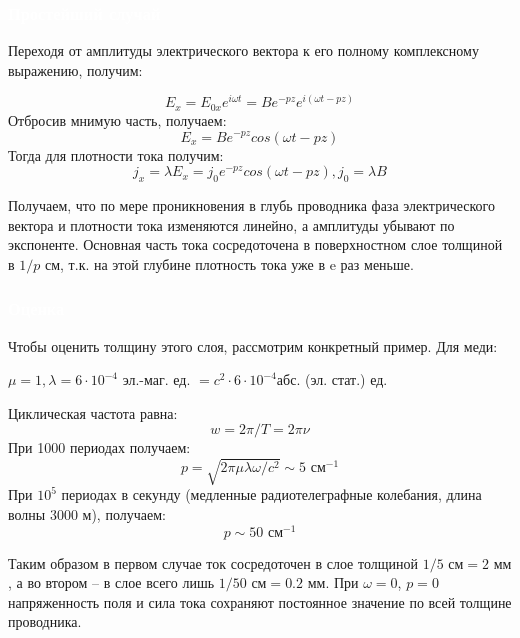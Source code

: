 \documentclass[aspectratio=169]{beamer}
\begin{document}
\begin{frame}
\frametitle{\textcolor{white}{Простейший случай}}
Переходя от амплитуды электрического вектора к его полному комплексному выражению, получим:

\begin{equation*}
E_x = E_{0x}e^{i \omega t} = B e^{-pz}e^{i(\omega t - p z)}
\end{equation*}
Отбросив мнимую часть, получаем:
\begin{equation*}
E_x = Be^{-pz}cos(\omega t - pz)
\end{equation*}
Тогда для плотности тока получим:
\begin{equation*}
j_x = \lambda E_x = j_0 e^{-pz}cos(\omega t - pz), j_0 = \lambda B
\end{equation*}

Получаем, что по мере проникновения в глубь проводника фаза электрического вектора и плотности тока изменяются линейно, а амплитуды убывают по экспоненте. 
Основная часть тока сосредоточена в поверхностном слое толщиной в $1/p$ см, т.к. на этой глубине плотность тока уже в e раз меньше. 
\end{frame}

\begin{frame}
\frametitle{\textcolor{white}{Оценка}}
Чтобы оценить толщину этого слоя, рассмотрим конкретный пример.
Для меди:

$\mu = 1, \lambda = 6 \cdot 10^{-4} $ эл.-маг. ед. $= c^2 \cdot 6 \cdot 10^{-4} $абс. (эл. стат.) ед.

Циклическая частота равна: 
\begin{equation*}
w = 2 \pi / T = 2 \pi \nu
\end{equation*}
При 1000 периодах получаем: 
\begin{equation*}
p = \sqrt{2 \pi \mu \lambda \omega / c^2} \sim 5 \text{  см}^{-1}
\end{equation*}
При $10^5$ периодах в секунду (медленные радиотелеграфные колебания, длина волны 3000 м), получаем:
\begin{equation*}
p \sim 50 \text{  см}^{-1}
\end{equation*}

Таким образом в первом случае ток сосредоточен в слое толщиной $1/5 \text{  см} = 2 \text{  мм}$, а во втором -- в слое всего лишь $1/50 \text{  см} = 0.2 \text{  мм}$.
При $\omega = 0$,	 $p = 0$  напряженность поля и сила тока сохраняют постоянное значение по всей толщине проводника.
\end{frame}
\end{document}
